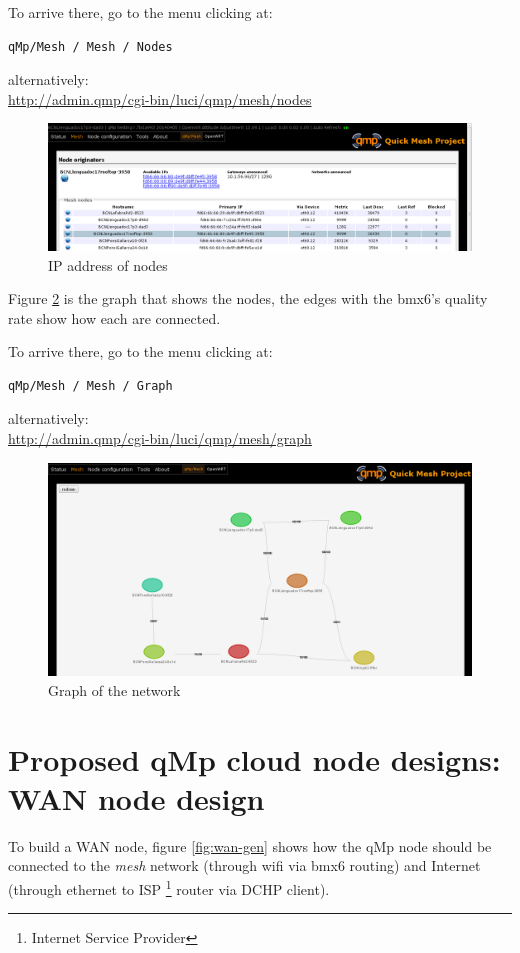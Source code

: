 \documentclass[11pt]{article}
\begin{document}
\noindent
To arrive there, go to the menu clicking at:
\begin{verbatim}
qMp/Mesh / Mesh / Nodes
\end{verbatim}
alternatively:\\
\url{http://admin.qmp/cgi-bin/luci/qmp/mesh/nodes}

\begin{figure}[htb]
\centering
\includegraphics[width=.9\linewidth]{./img/qMp-basics-scrot/net-of-nodes.png}
\caption{\label{fig:net-nodes}IP address of nodes}
\end{figure}

Figure \ref{fig:graph-network} is the graph that shows the nodes, the edges
with the bmx6's quality rate show how each are connected.

\noindent
To arrive there, go to the menu clicking at:
\begin{verbatim}
qMp/Mesh / Mesh / Graph
\end{verbatim}
alternatively:\\
\url{http://admin.qmp/cgi-bin/luci/qmp/mesh/graph}

\begin{figure}[htb]
\centering
\includegraphics[width=.9\linewidth]{./img/qMp-basics-scrot/graph.png}
\caption{\label{fig:graph-network}Graph of the network}
\end{figure}
\section{Proposed qMp cloud node designs: WAN node design}
\label{sec-8}
To build a WAN node, figure \ref{fig:wan-gen} shows how the qMp node should
be connected to the \emph{mesh} network (through wifi via bmx6 routing) and
Internet (through ethernet to ISP \footnote{Internet Service Provider} router via DCHP client).
\end{document}
